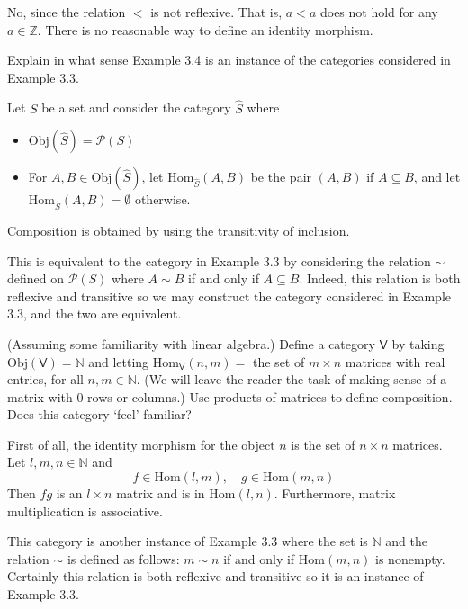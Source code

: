 \documentclass[../../master.tex]{subfiles}
\begin{document}
  \begin{solution}
    No, since the relation \(<\) is not reflexive. That is, \(a < a\) does not hold for any \(a \in \mathbb{Z}\).
    There is no reasonable way to define an identity morphism.
  \end{solution}

  \begin{problem}
    Explain in what sense Example 3.4 is an instance of the categories considered in Example 3.3.
  \end{problem}

  \begin{solution}
    Let \(S\) be a set and consider the category \(\hat{S}\) where
    \begin{itemize}
      \item \(\text{Obj}(\hat{S}) = \mathscr{P}(S)\)
      \item For \(A, B \in \text{Obj}(\hat{S})\), let \(\text{Hom}_{\hat{S}}(A, B)\) be the pair \((A, B)\) if \(A \subseteq B\),
      and let \(\text{Hom}_{\hat{S}}(A, B) = \emptyset\) otherwise.
      \end{itemize}
      Composition is obtained by using the transitivity of inclusion.

      This is equivalent to the category in Example 3.3 by considering the relation \(\sim\) defined on \(\mathscr{P}(S)\) where \(A \sim B\) if and only if \(A \subseteq B\).
      Indeed, this relation is both reflexive and transitive so we may construct the category considered in Example 3.3, and the two are equivalent.
  \end{solution}

  \begin{problem}
    (Assuming some familiarity with linear algebra.)
    Define a category \(\mathsf{V}\) by taking \(\text{Obj}(\mathsf{V}) = \mathbb{N}\)
    and letting \(\text{Hom}_{\mathsf{V}}(n, m) =\) the set of \(m \times n\) matrices with real entries, for all \(n, m \in \mathbb{N}\).
    (We will leave the reader the task of making sense of a matrix with 0 rows or columns.)
    Use products of matrices to define composition. Does this category `feel' familiar?
  \end{problem}

  \begin{solution}
    First of all, the identity morphism for the object \(n\) is the set of \(n \times n\) matrices.
    Let \(l, m, n \in \mathbb{N}\) and
    \begin{equation*}
      f \in \text{Hom}(l, m), \quad g \in \text{Hom}(m, n)
    \end{equation*}
    Then \(fg\) is an \(l \times n\) matrix and is in \(\text{Hom}(l, n)\).
    Furthermore, matrix multiplication is associative.

    This category is another instance of Example 3.3 where the set is \(\mathbb{N}\) and the relation \(\sim\) is defined as follows:
    \(m \sim n\) if and only if \(\text{Hom}(m, n)\) is nonempty.
    Certainly this relation is both reflexive and transitive so it is an instance of Example 3.3.
    \end{solution}
\end{document}
